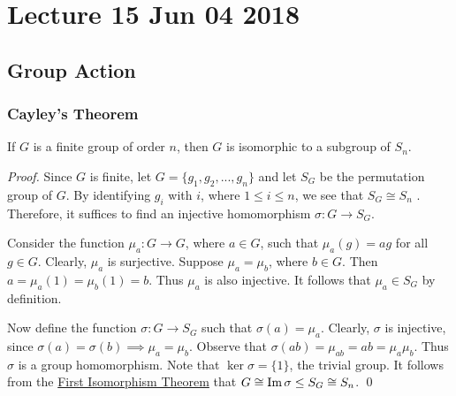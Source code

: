 \chapter{Lecture 15 Jun 04 2018}%
\label{chp:lecture_15_jun_04_2018}

\section{Group Action}%
\label{sec:group_action}

\subsection{Cayley's Theorem}%
\label{sub:cayley_s_theorem}

\begin{thm}
\label{thm:cayley_s_theorem}
  If $G$ is a finite group of order $n$, then $G$ is isomorphic to a subgroup of $S_n$.
\end{thm}

\begin{proof}
  Since $G$ is finite, let $G = \{g_1, g_2, ..., g_n\}$ and let $S_G$ be the permutation group of $G$. By identifying $g_i$ with $i$, where $1 \leq i \leq n$, we see that $S_G \cong S_n$ . Therefore, it suffices to find an injective homomorphism $\sigma : G \to S_G$.

  Consider the function $\mu_a : G \to G$, where $a \in G$, such that $\mu_a(g) = ag$ for all $g \in G$. Clearly, $\mu_a$ is surjective. Suppose $\mu_a = \mu_b$, where $b \in G$. Then $a = \mu_a (1) = \mu_b (1) = b$. Thus $\mu_a$ is also injective. It follows that $\mu_a \in S_G$ by definition.

  Now define the function $\sigma : G \to S_G$ such that $\sigma(a) = \mu_a$. Clearly, $\sigma$ is injective, since $\sigma(a) = \sigma(b) \implies \mu_a = \mu_b$. Observe that $\sigma(ab) = \mu_{ab} = ab = \mu_a \mu_b$. Thus $\sigma$ is a group homomorphism. Note that $\ker \sigma = \{1\}$, the trivial group. It follows from the \hyperref[thm:first_isomorphism_theorem]{First Isomorphism Theorem} that $G \cong \operatorname{Im} \sigma \leq S_G \cong S_n$.  \qed
\end{proof}

